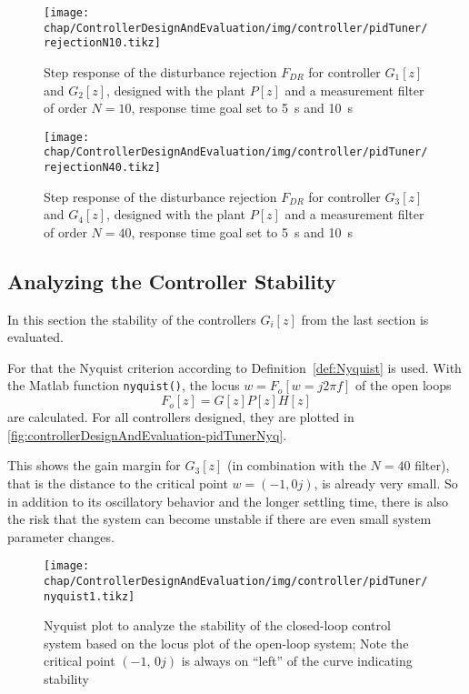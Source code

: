 \begin{figure}[tb]
	\centering
	\texttt{[image: chap/ControllerDesignAndEvaluation/img/controller/pidTuner/rejectionN10.tikz]}
	\caption[Disturbance rejection of controller one and two]{Step response of the disturbance rejection $F_{DR}$ for controller $G_1[z]$ and $G_2[z]$, designed with the plant $P[z]$ and a measurement filter of order $N=10$, response time goal set to \SI{5}{\second} and \SI{10}{\second}}
	\label{fig:controllerDesignAndEvaluation-pidTunerDRN10}
\end{figure}

\begin{figure}[tb]
	\centering
	\texttt{[image: chap/ControllerDesignAndEvaluation/img/controller/pidTuner/rejectionN40.tikz]}
	\caption[Disturbance rejection of controller three and four]{Step response of the disturbance rejection $F_{DR}$ for controller $G_3[z]$ and $G_4[z]$, designed with the plant $P[z]$ and a measurement filter of order $N=40$, response time goal set to \SI{5}{\second} and \SI{10}{\second}}
	\label{fig:controllerDesignAndEvaluation-pidTunerDRN40}
\end{figure}


\subsection{Analyzing the Controller Stability}
In this section the stability of the controllers $G_{i}[z]$ from the last section is evaluated.

For that the Nyquist criterion according to Definition~\ref{def:Nyquist} is used. With the Matlab function \texttt{nyquist()}, the locus $w=F_o[w=j2\pi f]$ of the open loops
\begin{equation}
F_o[z]=G[z] P[z] H[z]
\end{equation}
are calculated. For all controllers designed, they are plotted in \autoref{fig:controllerDesignAndEvaluation-pidTunerNyq}.

This shows the gain margin for $G_3[z]$ (in combination with the $N=40$ filter), that is the distance to the critical point $w=(-1,0j)$, is already very small. So in addition to its oscillatory behavior and the longer settling time, there is also the risk that the system can become unstable if there are even small system parameter changes.

\begin{figure}[tb]
	\centering
	\texttt{[image: chap/ControllerDesignAndEvaluation/img/controller/pidTuner/nyquist1.tikz]}
	\caption[Nyquist plot for all controllers]{Nyquist plot to analyze the stability of the closed-loop control system based on the locus plot of the open-loop system; Note the critical point $(-1,\,0j)$ is always on ``left'' of the curve indicating stability}
	\label{fig:controllerDesignAndEvaluation-pidTunerNyq}
\end{figure}

